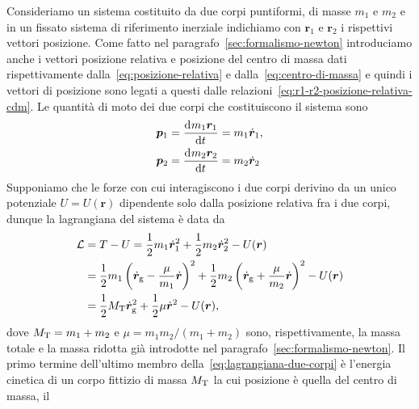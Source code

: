 Consideriamo un sistema costituito da due corpi puntiformi, di masse $m_1$ e
$m_2$ e in un fissato sistema di riferimento inerziale indichiamo con $\bm{r}_1$
e $\bm{r}_2$ i rispettivi vettori posizione. Come fatto nel
paragrafo~\ref{sec:formalismo-newton} introduciamo anche i vettori posizione
relativa e posizione del centro di massa dati rispettivamente
dalla~\eqref{eq:posizione-relativa} e dalla~\eqref{eq:centro-di-massa} e quindi
i vettori di posizione sono legati a questi dalle
relazioni~\eqref{eq:r1-r2-posizione-relativa-cdm}. Le quantità di moto dei due
corpi che costituiscono il sistema sono
\begin{subequations}
  \begin{align}
    \bm{p}_1 &= \frac{{\mathop{}\!\mathrm{d}^{}}m_1\bm{r}_1}{\mathop{}\!\mathrm{d} {t}^{}} = m_1\dot{\bm{r}}_1, \\
    \bm{p}_2 &= \frac{{\mathop{}\!\mathrm{d}^{}}m_2\bm{r}_2}{\mathop{}\!\mathrm{d} {t}^{}} = m_2\dot{\bm{r}}_2
  \end{align}
\end{subequations}
Supponiamo che le forze con cui interagiscono i due corpi derivino da un unico
potenziale $U=U(\bm{r})$ dipendente solo dalla posizione relativa fra i due
corpi, dunque la lagrangiana del sistema è data da
\begin{equation}
  \label{eq:lagrangiana-due-corpi}
  \begin{split}
    \mathcal{L} &= T - U = \frac{1}{2}m_1\dot{\bm{r}}_1^2 +
    \frac{1}{2}m_2\dot{\bm{r}}_2^2 - U(\bm{r}) \\
    &= \frac{1}{2}m_1
    \left(
      \dot{\bm{r}}_\textup{g} -
      \frac{\mu}{m_1}\dot{\bm{r}}
    \right)^2 + \frac{1}{2}m_2
    \left(
      \dot{\bm{r}}_\textup{g} +
      \frac{\mu}{m_2}\dot{\bm{r}}
    \right)^2 - U(\bm{r}) \\
    &= \frac{1}{2}M_\textup{T}\dot{\bm{r}}_\textup{g}^2 +
    \frac{1}{2}\mu\dot{\bm{r}}^2 - U(\bm{r}),
\end{split}
\end{equation}
dove $M_\textup{T}=m_1+m_2$ e $\mu=m_1m_2/(m_1+m_2)$ sono, rispettivamente, la
massa totale e la massa ridotta già introdotte nel
paragrafo~\ref{sec:formalismo-newton}. Il primo termine dell'ultimo membro
della~\eqref{eq:lagrangiana-due-corpi} è l'energia cinetica di un corpo fittizio
di massa $M_\textup{T}$ la cui posizione è quella del centro di massa, il
